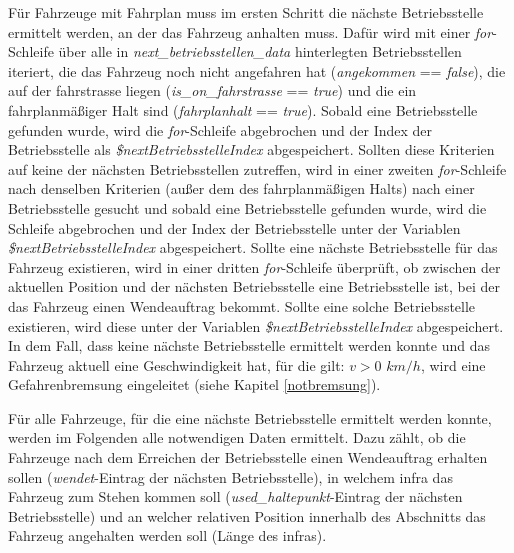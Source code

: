 Für Fahrzeuge mit Fahrplan muss im ersten Schritt die nächste Betriebsstelle ermittelt werden, an der das Fahrzeug anhalten muss. Dafür wird mit einer \textit{for}-Schleife über alle in \textit{next\_betriebsstellen\_data} hinterlegten Betriebsstellen iteriert, die das Fahrzeug noch nicht angefahren hat (\textit{angekommen} == \textit{false}), die auf der \Gls{fahrstrasse} liegen (\textit{is\_on\_fahrstrasse} == \textit{true}) und die ein fahrplanmäßiger Halt sind (\textit{fahrplanhalt} == \textit{true}). Sobald eine Betriebsstelle gefunden wurde, wird die \textit{for}-Schleife abgebrochen und der Index der Betriebsstelle als \textit{\$nextBetriebsstelleIndex} abgespeichert. Sollten diese Kriterien auf keine der nächsten Betriebsstellen zutreffen, wird in einer zweiten \textit{for}-Schleife nach denselben Kriterien (außer dem des fahrplanmäßigen Halts) nach einer Betriebsstelle gesucht und sobald eine Betriebsstelle gefunden wurde, wird die Schleife abgebrochen und der Index der Betriebsstelle unter der Variablen \textit{\$nextBetriebsstelleIndex} abgespeichert. Sollte eine nächste Betriebsstelle für das Fahrzeug existieren, wird in einer dritten \textit{for}-Schleife überprüft, ob zwischen der aktuellen Position und der nächsten Betriebsstelle eine Betriebsstelle ist, bei der das Fahrzeug einen Wendeauftrag bekommt. Sollte eine solche Betriebsstelle existieren, wird diese unter der Variablen \textit{\$nextBetriebsstelleIndex} abgespeichert. In dem Fall, dass keine nächste Betriebsstelle ermittelt werden konnte und das Fahrzeug aktuell eine Geschwindigkeit hat, für die gilt: $v>0$ $km/h$, wird eine Gefahrenbremsung eingeleitet (siehe Kapitel \ref{notbremsung}). 

Für alle Fahrzeuge, für die eine nächste Betriebsstelle ermittelt werden konnte, werden im Folgenden alle notwendigen Daten ermittelt. Dazu zählt, ob die Fahrzeuge nach dem Erreichen der Betriebsstelle einen Wendeauftrag erhalten sollen (\textit{wendet}-Eintrag der nächsten Betriebsstelle), in welchem \ac{infra} das Fahrzeug zum Stehen kommen soll (\textit{used\_haltepunkt}-Eintrag der nächsten Betriebsstelle) und an welcher relativen Position innerhalb des Abschnitts das Fahrzeug angehalten werden soll (Länge des \ac{infra}s). 

